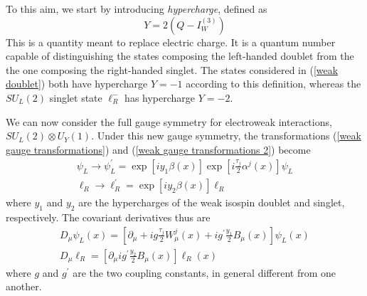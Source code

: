 \documentclass[10pt,a4paper]{book}
\begin{document}
To this aim, we start by introducing \emph{hypercharge}, defined as
\begin{equation}
\label{def hypercharge}
Y = 2(Q-I^{(3)}_W)
\end{equation} 
This is a quantity meant to replace electric charge. It is a quantum number capable of distinguishing the states composing the left-handed doublet from the the one composing the right-handed singlet. The states considered in (\ref{weak doublet}) both have hypercharge $Y=-1$ according to this definition, whereas the $SU_L(2)$ singlet state $\ell^-_R$ has hypercharge $Y=-2$. 

We can now consider the full gauge symmetry for electroweak interactions, $SU_L(2) \otimes U_Y(1)$. Under this new gauge symmetry, the transformations (\ref{weak gauge transformations}) and (\ref{weak gauge transformations 2}) become
\begin{gather}
\label{electroweak gauge transformations}
\psi_L \rightarrow \psi_L^\prime = \exp\left[iy_1\beta(x)\right]\exp\left[i\frac{\tau_j}{2} \alpha^j (x)\right]\psi_L \\
\ell_R \rightarrow \ell_R^\prime = \exp\left[iy_2\beta(x)\right]\ell_R
\end{gather}
where $y_1$ and $y_2$ are the hypercharges of the weak isospin doublet and singlet, respectively. The covariant derivatives thus are
\begin{gather}
\label{EW covariant}
D_\mu \psi_L(x) = \left[\partial_\mu + ig\frac{\tau_j}{2}W^j_\mu(x) + ig^\prime \frac{y_1}{2} B_\mu(x) \right]\psi_L(x) \\
D_\mu \ell_R = \left[\partial_\mu ig^\prime \frac{y_2}{2} B_\mu(x)\right]\ell_R(x)
\end{gather}
where $g$ and $g^\prime$ are the two coupling constants, in general different from one another.
\end{document}
